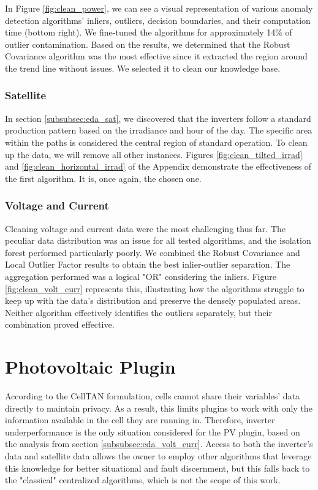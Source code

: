 In Figure \ref{fig:clean_power}, we can see a visual representation of various anomaly detection algorithms' inliers, outliers, decision boundaries, and their computation time (bottom right). We fine-tuned the algorithms for approximately 14\% of outlier contamination. Based on the results, we determined that the Robust Covariance algorithm was the most effective since it extracted the region around the trend line without issues. We selected it to clean our knowledge base.

\subsubsection{Satellite}

In section \ref{subsubsec:eda_sat}, we discovered that the inverters follow a standard production pattern based on the irradiance and hour of the day. The specific area within the paths is considered the central region of standard operation. To clean up the data, we will remove all other instances. Figures \ref{fig:clean_tilted_irrad} and \ref{fig:clean_horizontal_irrad} of the Appendix demonstrate the effectiveness of the first algorithm. It is, once again, the chosen one.

\subsubsection{Voltage and Current}

Cleaning voltage and current data were the most challenging thus far. The peculiar data distribution was an issue for all tested algorithms, and the isolation forest performed particularly poorly. We combined the Robust Covariance and Local Outlier Factor results to obtain the best inlier-outlier separation. The aggregation performed was a logical "OR" considering the inliers. Figure \ref{fig:clean_volt_curr} represents this, illustrating how the algorithms struggle to keep up with the data's distribution and preserve the densely populated areas. Neither algorithm effectively identifies the outliers separately, but their combination proved effective.

\section{Photovoltaic Plugin} \label{sec:pvplugin}

According to the CellTAN formulation, cells cannot share their variables' data directly to maintain privacy. As a result, this limits plugins to work with only the information available in the cell they are running in. Therefore, inverter underperformance is the only situation considered for the PV plugin, based on the analysis from section \ref{subsubsec:eda_volt_curr}. Access to both the inverter's data and satellite data allows the owner to employ other algorithms that leverage this knowledge for better situational and fault discernment, but this falls back to the "classical" centralized algorithms, which is not the scope of this work.


